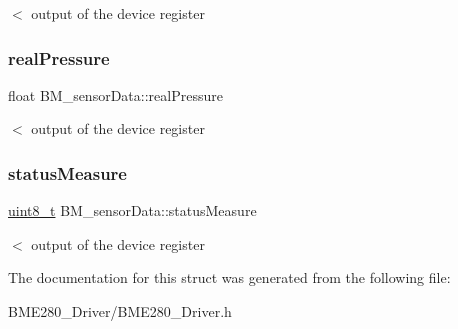 $<$ output of the device register \mbox{\label{structBM__sensorData_a616031c2e11814b054f9f43e7fce12fc}} 
\subsubsection{\texorpdfstring{real\+Pressure}{realPressure}}
{\footnotesize\ttfamily float B\+M\+\_\+sensor\+Data\+::real\+Pressure}

$<$ output of the device register \mbox{\label{structBM__sensorData_ac415745c07825ddb08643ef66c2ec1a9}} 
\subsubsection{\texorpdfstring{status\+Measure}{statusMeasure}}
{\footnotesize\ttfamily \hyperlink{vl53l0x__types_8h_aba7bc1797add20fe3efdf37ced1182c5}{uint8\+\_\+t} B\+M\+\_\+sensor\+Data\+::status\+Measure}

$<$ output of the device register 

The documentation for this struct was generated from the following file\+:\begin{DoxyCompactItemize}
\item 
B\+M\+E280\+\_\+\+Driver/B\+M\+E280\+\_\+\+Driver.\+h\end{DoxyCompactItemize}
